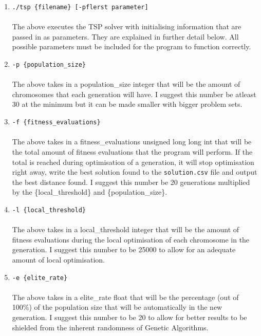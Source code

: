 \documentclass[12pt]{article}
\begin{document}
\begin{enumerate}
	\item \texttt{./tsp \{filename\} [-pflerst parameter]}\\\\
		The above executes the TSP solver with initialising information that are passed in as parameters. They are explained in further detail below. All possible parameters must be included for the program to function correctly.\\
	
	\item \texttt{-p \{population\_size\}}\\\\
		The above takes in a population\_size integer that will be the amount of chromosomes that each generation will have. I suggest this number be atleast 30 at the minimum but it can be made smaller with bigger problem sets.\\
		
	\item \texttt{-f \{fitness\_evaluations\}}\\\\
	The above takes in a fitness\_evaluations unsigned long long int that will be the total amount of fitness evaluations that the program will perform. If the total is reached during optimisation of a generation, it will stop optimisation right away, write the best solution found to the \texttt{solution.csv} file and output the best distance found. I suggest this number be 20 generations multiplied by the \{local\_threshold\} and \{population\_size\}.\\
	
	\item \texttt{-l \{local\_threshold\}}\\\\
	The above takes in a local\_threshold integer that will be the amount of fitness evaluations during the local optimisation of each chromosome in the generation. I suggest this number to be 25000 to allow for an adequate amount of local optimisation.\\
	
	\item \texttt{-e \{elite\_rate\}}\\\\
	The above takes in a elite\_rate float that will be the percentage (out of 100\%) of the population size that will be automatically in the new generation. I suggest this number to be 20 to allow for better results to be shielded from the inherent randomness of Genetic Algorithms.\\
	

\end{enumerate}
\end{document}

